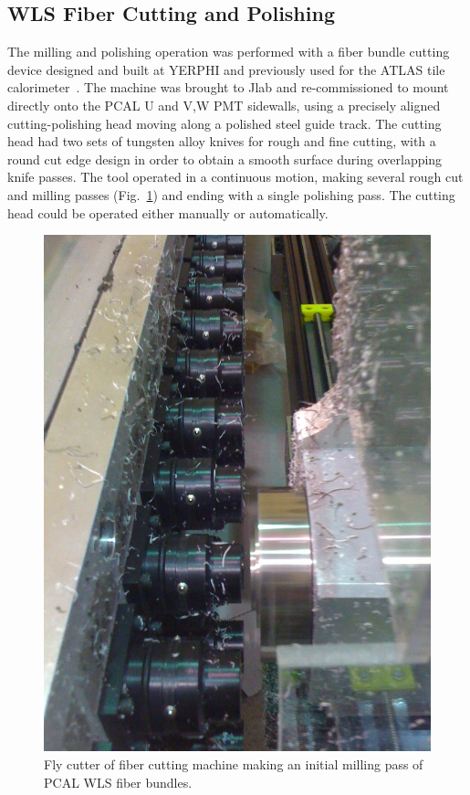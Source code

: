 \subsection{WLS Fiber Cutting and Polishing}
\label{WLS cutting}

The milling and polishing operation was performed with a fiber bundle cutting device designed and built at YERPHI and
previously used for the ATLAS tile calorimeter~\cite{ATLAS1997}.  The machine was brought to Jlab and re-commissioned to mount directly onto the PCAL 
U and V,W PMT sidewalls, using a precisely aligned cutting-polishing head moving along a polished steel guide track.  The cutting head had two sets of tungsten alloy knives for rough and fine cutting, with a round cut edge design in order to obtain a smooth surface during overlapping knife passes. The tool operated in a continuous motion, making several rough cut and milling passes (Fig.~\ref{fig:S3_5d}) and ending with a single polishing pass.  The cutting head could be operated either manually or automatically. 

\begin{figure}[hbt]
\centering
\includegraphics[width=0.95\columnwidth,keepaspectratio]{img/S3_5d.png}
\caption[Cutter 2]{Fly cutter of fiber cutting machine making an initial milling pass of PCAL WLS fiber bundles.}
\label{fig:S3_5d}
\end{figure}

